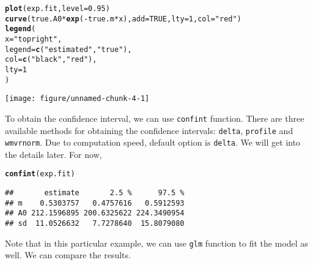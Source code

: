 \documentclass{article}\usepackage[]{graphicx}\usepackage[]{color}
\makeatletter
\def\maxwidth{ %
  \ifdim\Gin@nat@width>\linewidth
    \linewidth
  \else
    \Gin@nat@width
  \fi
}
\newcommand{\hlnum}[1]{\textcolor[rgb]{0.686,0.059,0.569}{#1}}%
\newcommand{\hlstr}[1]{\textcolor[rgb]{0.192,0.494,0.8}{#1}}%
\newcommand{\hlopt}[1]{\textcolor[rgb]{0,0,0}{#1}}%
\newcommand{\hlstd}[1]{\textcolor[rgb]{0.345,0.345,0.345}{#1}}%
\newcommand{\hlkwc}[1]{\textcolor[rgb]{0.333,0.667,0.333}{#1}}%
\newcommand{\hlkwd}[1]{\textcolor[rgb]{0.737,0.353,0.396}{\textbf{#1}}}%
\newenvironment{kframe}{%
 \def\at@end@of@kframe{}%
 \ifinner\ifhmode%
  \def\at@end@of@kframe{\end{minipage}}%
  \begin{minipage}{\columnwidth}%
 \fi\fi%
 \def\FrameCommand##1{\hskip\@totalleftmargin \hskip-\fboxsep
 \colorbox{shadecolor}{##1}\hskip-\fboxsep
     \hskip-\linewidth \hskip-\@totalleftmargin \hskip\columnwidth}%
 \MakeFramed {\advance\hsize-\width
   \@totalleftmargin\z@ \linewidth\hsize
   \@setminipage}}%
 {\par\unskip\endMakeFramed%
 \at@end@of@kframe}
\newenvironment{knitrout}{}{} %
\newcommand{\code}[1]{{\tt #1}}
\makeatother
\begin{document}
\begin{knitrout}
\color{fgcolor}\begin{kframe}
\begin{alltt}
\hlkwd{plot}\hlstd{(exp.fit,} \hlkwc{level}\hlstd{=}\hlnum{0.95}\hlstd{)}
\hlkwd{curve}\hlstd{(true.A0} \hlopt{*} \hlkwd{exp}\hlstd{(}\hlopt{-}\hlstd{true.m}\hlopt{*}\hlstd{x),} \hlkwc{add}\hlstd{=}\hlnum{TRUE}\hlstd{,} \hlkwc{lty}\hlstd{=}\hlnum{1}\hlstd{,} \hlkwc{col}\hlstd{=}\hlstr{"red"}\hlstd{)}
\hlkwd{legend}\hlstd{(}
    \hlkwc{x}\hlstd{=}\hlstr{"topright"}\hlstd{,}
    \hlkwc{legend}\hlstd{=}\hlkwd{c}\hlstd{(}\hlstr{"estimated"}\hlstd{,} \hlstr{"true"}\hlstd{),}
    \hlkwc{col}\hlstd{=}\hlkwd{c}\hlstd{(}\hlstr{"black"}\hlstd{,} \hlstr{"red"}\hlstd{),}
    \hlkwc{lty}\hlstd{=}\hlnum{1}
\hlstd{)}
\end{alltt}
\end{kframe}
\texttt{[image: figure/unnamed-chunk-4-1]} 

\end{knitrout}

To obtain the confidence interval, we can use \code{confint} function.
There are three available methods for obtaining the confidence intervals: \code{delta}, \code{profile} and \code{wmvrnorm}.
Due to computation speed, default option is \code{delta}.
We will get into the details later.
For now,

\begin{knitrout}
\color{fgcolor}\begin{kframe}
\begin{alltt}
\hlkwd{confint}\hlstd{(exp.fit)}
\end{alltt}
\begin{verbatim}
##       estimate       2.5 %      97.5 %
## m    0.5303757   0.4757616   0.5912593
## A0 212.1596895 200.6325622 224.3490954
## sd  11.0526632   7.7278640  15.8079080
\end{verbatim}
\end{kframe}
\end{knitrout}

Note that in this particular example, we can use \code{glm} function to fit the model as well.
We can compare the results.
\end{document}
